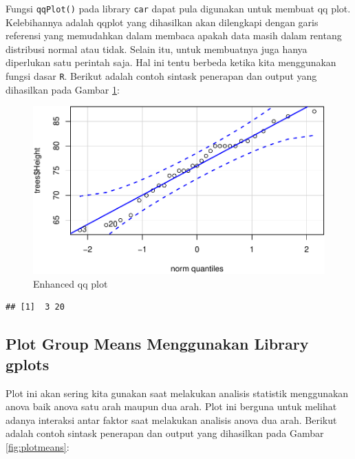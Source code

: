 \documentclass[]{book}
\newenvironment{Shaded}{\begin{snugshade}}{\end{snugshade}}
\newcommand{\KeywordTok}[1]{\textcolor[rgb]{0.13,0.29,0.53}{\textbf{#1}}}
\newcommand{\CommentTok}[1]{\textcolor[rgb]{0.56,0.35,0.01}{\textit{#1}}}
\newcommand{\OperatorTok}[1]{\textcolor[rgb]{0.81,0.36,0.00}{\textbf{#1}}}
\newcommand{\NormalTok}[1]{#1}
\begin{document}
Fungsi \texttt{qqPlot()} pada library \texttt{car} dapat pula digunakan
untuk membuat qq plot. Kelebihannya adalah qqplot yang dihasilkan akan
dilengkapi dengan garis referensi yang memudahkan dalam membaca apakah
data masih dalam rentang distribusi normal atau tidak. Selain itu, untuk
membuatnya juga hanya diperlukan satu perintah saja. Hal ini tentu
berbeda ketika kita menggunakan fungsi dasar \texttt{R}. Berikut adalah
contoh sintask penerapan dan output yang dihasilkan pada Gambar
\ref{fig:carqqplot}:

\begin{Shaded}
\end{Shaded}

\begin{figure}

{\centering \includegraphics[width=0.7\linewidth]{EnvStat_files/figure-latex/carqqplot-1} 

}

\caption{Enhanced qq plot}\label{fig:carqqplot}
\end{figure}

\begin{verbatim}
## [1]  3 20
\end{verbatim}

\subsection{Plot Group Means Menggunakan Library
gplots}\label{plot-group-means-menggunakan-library-gplots}

Plot ini akan sering kita gunakan saat melakukan analisis statistik
menggunakan anova baik anova satu arah maupun dua arah. Plot ini berguna
untuk melihat adanya interaksi antar faktor saat melakukan analisis
anova dua arah. Berikut adalah contoh sintask penerapan dan output yang
dihasilkan pada Gambar \ref{fig:plotmeans}:
\end{document}
